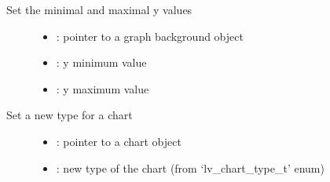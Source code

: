 \documentclass[letterpaper,10pt,english]{sphinxmanual}
\begin{document}
\begin{fulllineitems}
\label{\detokenize{object-types/chart:_CPPv418lv_chart_set_rangeP8lv_obj_t10lv_coord_t10lv_coord_t}}%
\pysigstartmultiline
{}\label{\detokenize{object-types/chart:lv__chart_8h_1a8b64f7c9dd8bf948d29a813a890053d8}}%
\pysigstopmultiline
Set the minimal and maximal y values \begin{description}
\item[{}] \leavevmode\begin{itemize}
\item {} 
: pointer to a graph background object 

\item {} 
: y minimum value 

\item {} 
: y maximum value 

\end{itemize}

\end{description}


\end{fulllineitems}


\begin{fulllineitems}
\label{\detokenize{object-types/chart:_CPPv417lv_chart_set_typeP8lv_obj_t15lv_chart_type_t}}%
\pysigstartmultiline
{}\label{\detokenize{object-types/chart:lv__chart_8h_1ab37e407ed3add8795a4a8e6db3fe0548}}%
\pysigstopmultiline
Set a new type for a chart \begin{description}
\item[{}] \leavevmode\begin{itemize}
\item {} 
: pointer to a chart object 

\item {} 
: new type of the chart (from ‘lv\_chart\_type\_t’ enum) 

\end{itemize}

\end{description}


\end{fulllineitems}
\end{document}

